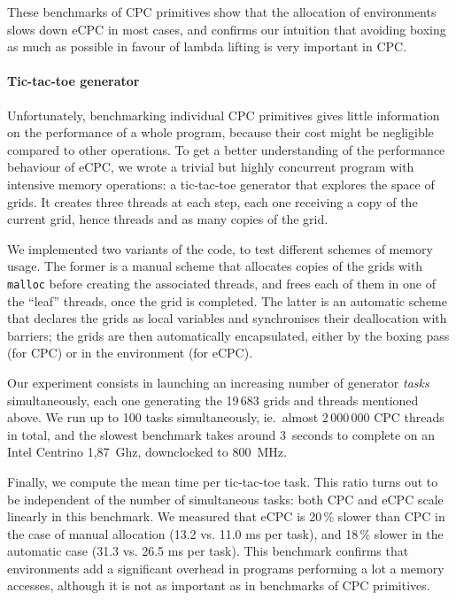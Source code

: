 \documentclass[a4paper]{llncs}
\begin{document}
These benchmarks of CPC primitives show that the allocation of environments
slows down eCPC in most cases, and confirms our intuition that avoiding boxing
as much as possible in favour of lambda lifting is very important in CPC.


\paragraph{Tic-tac-toe generator}

Unfortunately, benchmarking individual CPC primitives gives little information
on the performance of a whole program, because their cost might be negligible
compared to other operations.   To get a better understanding of the performance
behaviour of eCPC, we wrote a trivial but highly concurrent program with
intensive memory operations: a tic-tac-toe generator that explores the space of
grids.  It creates three threads at each step, each one receiving a copy of the
current grid, hence  threads and as many copies of the grid.

We implemented two variants of the code, to test different schemes of memory
usage.  The former is a manual scheme that allocates copies of the grids with
\texttt{malloc} before creating the associated threads, and frees each of them
in one of the ``leaf'' threads, once the grid is completed.  The latter is an
automatic scheme that declares the grids as local variables and synchronises
their deallocation with barriers;  the grids are then automatically
encapsulated, either by the boxing pass (for CPC) or in the environment (for
eCPC).

Our experiment consists in launching an increasing number of generator
\emph{tasks} simultaneously, each one generating the 19\,683 grids and threads
mentioned above.  We run up to 100 tasks simultaneously, ie.\ almost 2\,000\,000
CPC threads in total, and the slowest benchmark takes around 3~seconds to
complete on an Intel Centrino 1,87~Ghz, downclocked to 800~MHz.

Finally, we compute the mean time per tic-tac-toe task. This ratio turns out
to be independent of the number of simultaneous tasks: both CPC and eCPC scale linearly
in this benchmark.  We measured that eCPC is 20\,\% slower than CPC in the case
of manual allocation (13.2 vs. 11.0 ms per task), and 18\,\% slower in the
automatic case (31.3 vs. 26.5 ms per task).  This benchmark confirms that
environments add a significant overhead in programs performing a lot a memory
accesses, although it is not as important as in benchmarks of CPC primitives.
\end{document}

